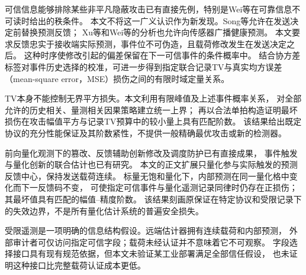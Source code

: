可信信息能够排除某些非平凡隐蔽攻击已有直接先例，特别是Wei等在可靠信息不可读时给出的秩条件\cite{wei2026}。
本文不将这一广义认识作为新发现。Song等允许在发送决定前替换预测反馈；
Xu等和Wei等的分析也允许向传感器广播健康预测\cite{song2022,xu2023,wei2026}。
本文要求反馈忠实于接收端实际预测，事件位不可伪造，且载荷修改发生在发送决定之后。
这种时序使修改引起的偏差保留在下一可信事件的条件概率中。
结合协方差标签对事件历史选择的校准，可进一步得到指定联合记录TV与真实均方误差（mean-square error，MSE）损伤之间的有限时域定量关系。

TV本身不能控制无界平方损失。本文利用有限峰值及上述事件概率关系，
对全部允许的历史相关、量测相关因果策略建立统一上界；
再以合法单拍构造证明最坏损伤在攻击幅值平方与记录TV预算中的较小量上具有匹配阶数。
该结果给出既定协议的充分性能保证及其阶数紧性，不提供一般精确最优攻击或新的检测器。

前向量化观测下的篡改、反馈辅助创新修改及调度防护已有直接成果\cite{li2026,li2025}，
事件触发与量化创新的联合估计也已有研究\cite{shen2025}。
本文的正文扩展只量化参与实际触发的预测反馈中心，保持发送载荷连续。
标量无饱和量化下，内部预测在同一量化格中变化而下一反馈码不变，
可使指定可信事件与量化遥测记录同律时仍存在正损伤；其最坏值具有匹配的幅值--精度阶数。
该结果刻画原保证在特定协议和受限记录下的失效边界，不是所有量化估计系统的普遍安全损失。

受限遥测是一项明确的信息结构假设。远端估计器拥有连续载荷和内部预测，
外部审计者可仅访问指定可信字段；载荷未经认证并不意味着它不可观察。
字段选择接口具有现有规范依据\cite{opcdata}，但本文未验证某工业部署满足全部信任假设，
也未证明这种接口比完整载荷认证成本更低。
